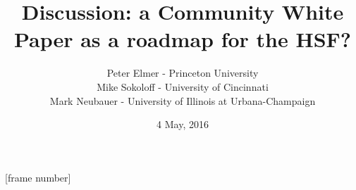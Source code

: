 \documentclass{beamer}
\title{Discussion: a Community White Paper as a roadmap for the HSF?}
\author{Peter Elmer - Princeton University \\
        Mike Sokoloff - University of Cincinnati \\
        Mark Neubauer - University of Illinois at Urbana-Champaign}
\date{4 May, 2016}
\begin{document}
\maketitle

%
%

[frame number]










\end{document}
